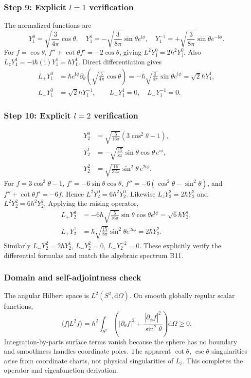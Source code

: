 \documentclass[11pt,a4paper]{article}
\newcommand{\dd}{\mathrm{d}}
\newcommand{\iu}{\mathrm{i}}
\newcommand{\p}{\partial}
\begin{document}
\subsubsection*{Step 9: Explicit \texorpdfstring{$l=1$}{l=1} verification}
The normalized functions are
\begin{equation}Y_1^0=\sqrt{\frac3{4\pi}}\cos\theta,\quad Y_1^1=-\sqrt{\frac3{8\pi}}\sin\theta e^{\iu\phi},\quad Y_1^{-1}=+\sqrt{\frac3{8\pi}}\sin\theta e^{-\iu\phi}.\end{equation}
For \(f=\cos\theta\), \(f''+\cot\theta f'=-2\cos\theta\), giving \(L^2Y_1^0=2\hbar^2Y_1^0\). Also \(L_zY_1^1=-\iu\hbar(\iu)Y_1^1=\hbar Y_1^1\). Direct differentiation gives
\begin{align}
L_+Y_1^0&=\hbar e^{\iu\phi}\p_\theta\left(\sqrt{\frac3{4\pi}}\cos\theta\right)=-\hbar\sqrt{\frac3{4\pi}}\sin\theta e^{\iu\phi}=\sqrt2\hbar Y_1^1,\\
L_-Y_1^0&=\sqrt2\hbar Y_1^{-1},\qquad L_+Y_1^1=0,\quad L_-Y_1^{-1}=0.
\end{align}

\subsubsection*{Step 10: Explicit \texorpdfstring{$l=2$}{l=2} verification}
\begin{align}
Y_2^0&=\sqrt{\frac5{16\pi}}(3\cos^2\theta-1),\\
Y_2^1&=-\sqrt{\frac{15}{8\pi}}\sin\theta\cos\theta\,e^{\iu\phi},\\
Y_2^2&=\sqrt{\frac{15}{32\pi}}\sin^2\theta\,e^{2\iu\phi}.
\end{align}
For \(f=3\cos^2\theta-1\), \(f'=-6\sin\theta\cos\theta\), \(f''=-6(\cos^2\theta-\sin^2\theta)\), and \(f''+\cot\theta f'=-6f\). Hence \(L^2Y_2^0=6\hbar^2Y_2^0\). Likewise \(L_zY_2^2=2\hbar Y_2^2\) and \(L^2Y_2^2=6\hbar^2Y_2^2\). Applying the raising operator,
\begin{align}
L_+Y_2^0&=-6\hbar\sqrt{\frac5{16\pi}}\sin\theta\cos\theta e^{\iu\phi}=\sqrt6\hbar Y_2^1,\\
L_+Y_2^1&=\hbar\sqrt{\frac{15}{8\pi}}\sin^2\theta e^{2\iu\phi}=2\hbar Y_2^2.
\end{align}
Similarly \(L_-Y_2^2=2\hbar Y_2^1\), \(L_+Y_2^2=0\), \(L_-Y_2^{-2}=0\). These explicitly verify the differential formulas and match the algebraic spectrum B11.

\subsubsection*{Domain and self-adjointness check}
The angular Hilbert space is \(L^2(S^2,\dd\Omega)\). On smooth globally regular scalar functions,
\begin{equation}\langle f|L^2f\rangle=\hbar^2\int_{S^2}\left(|\p_\theta f|^2+\frac{|\p_\phi f|^2}{\sin^2\theta}\right)\dd\Omega\ge0.\end{equation}
Integration-by-parts surface terms vanish because the sphere has no boundary and smoothness handles coordinate poles. The apparent \(\cot\theta\), \(\csc\theta\) singularities arise from coordinate charts, not physical singularities of \(L_i\). This completes the operator and eigenfunction derivation.
\end{document}
